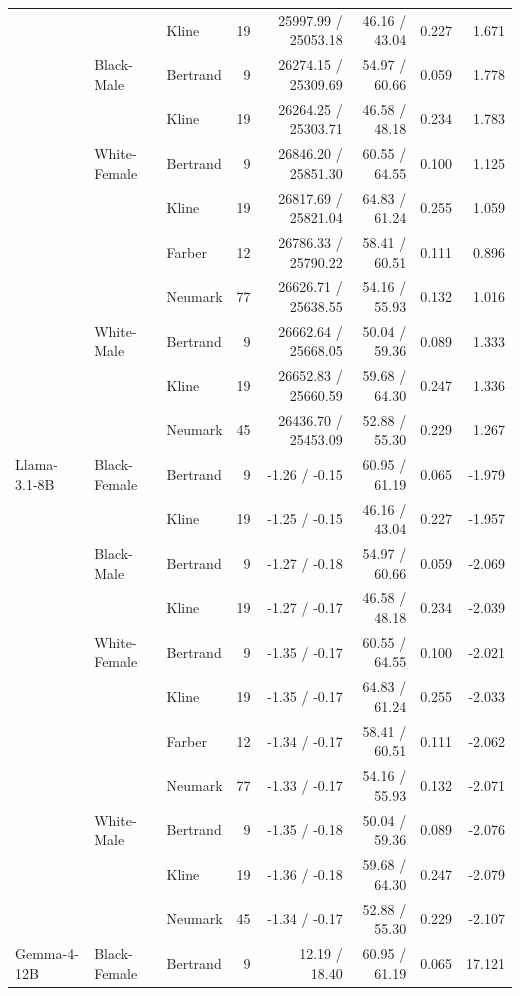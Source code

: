 \begin{longtable}{@{}lllrrrrr@{}}
 &  & Kline & 19 & 25997.99 / 25053.18 & 46.16 / 43.04 & 0.227 & 1.671 \\
 & Black-Male & Bertrand & 9 & 26274.15 / 25309.69 & 54.97 / 60.66 & 0.059 & 1.778 \\
 &  & Kline & 19 & 26264.25 / 25303.71 & 46.58 / 48.18 & 0.234 & 1.783 \\
 & White-Female & Bertrand & 9 & 26846.20 / 25851.30 & 60.55 / 64.55 & 0.100 & 1.125 \\
 &  & Kline & 19 & 26817.69 / 25821.04 & 64.83 / 61.24 & 0.255 & 1.059 \\
 &  & Farber & 12 & 26786.33 / 25790.22 & 58.41 / 60.51 & 0.111 & 0.896 \\
 &  & Neumark & 77 & 26626.71 / 25638.55 & 54.16 / 55.93 & 0.132 & 1.016 \\
 & White-Male & Bertrand & 9 & 26662.64 / 25668.05 & 50.04 / 59.36 & 0.089 & 1.333 \\
 &  & Kline & 19 & 26652.83 / 25660.59 & 59.68 / 64.30 & 0.247 & 1.336 \\
 &  & Neumark & 45 & 26436.70 / 25453.09 & 52.88 / 55.30 & 0.229 & 1.267 \\
\addlinespace
Llama-3.1-8B & Black-Female & Bertrand & 9 & -1.26 / -0.15 & 60.95 / 61.19 & 0.065 & -1.979 \\
 &  & Kline & 19 & -1.25 / -0.15 & 46.16 / 43.04 & 0.227 & -1.957 \\
 & Black-Male & Bertrand & 9 & -1.27 / -0.18 & 54.97 / 60.66 & 0.059 & -2.069 \\
 &  & Kline & 19 & -1.27 / -0.17 & 46.58 / 48.18 & 0.234 & -2.039 \\
 & White-Female & Bertrand & 9 & -1.35 / -0.17 & 60.55 / 64.55 & 0.100 & -2.021 \\
 &  & Kline & 19 & -1.35 / -0.17 & 64.83 / 61.24 & 0.255 & -2.033 \\
 &  & Farber & 12 & -1.34 / -0.17 & 58.41 / 60.51 & 0.111 & -2.062 \\
 &  & Neumark & 77 & -1.33 / -0.17 & 54.16 / 55.93 & 0.132 & -2.071 \\
 & White-Male & Bertrand & 9 & -1.35 / -0.18 & 50.04 / 59.36 & 0.089 & -2.076 \\
 &  & Kline & 19 & -1.36 / -0.18 & 59.68 / 64.30 & 0.247 & -2.079 \\
 &  & Neumark & 45 & -1.34 / -0.17 & 52.88 / 55.30 & 0.229 & -2.107 \\
\addlinespace
Gemma-4-12B & Black-Female & Bertrand & 9 & 12.19 / 18.40 & 60.95 / 61.19 & 0.065 & 17.121 \\

\end{longtable}
